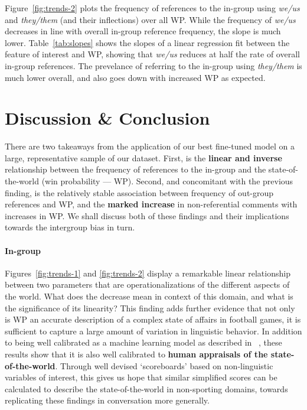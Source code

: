 Figure~\ref{fig:trends-2} plots the frequency of references to the in-group using \emph{we/us} and \emph{they/them} (and their inflections) over all WP. While the frequency of \emph{we/us} decreases in line with overall in-group reference frequency, the slope is much lower. Table~\ref{tab:slopes} shows the slopes of a linear regression fit between the feature of interest and WP, showing that \emph{we/us} reduces at half the rate of overall in-group references. The prevelance of referring to the in-group using \emph{they/them} is much lower overall, and also goes down with increased WP as expected.

\section{Discussion \& Conclusion}
\label{sec:football-conclusion}

There are two takeaways from the application of our best fine-tuned model on a large, representative sample of our dataset. First, is the \textbf{linear and inverse} relationship between the frequency of references to the in-group and the state-of-the-world (win probability --- WP). Second, and concomitant with the previous finding, is the relatively stable association between frequency of out-group references and WP, and the \textbf{marked increase} in non-referential comments with increases in WP. We shall discuss both of these findings and their implications towards the intergroup bias in turn.

\paragraph{In-group} Figures~\ref{fig:trends-1} and \ref{fig:trends-2} display a remarkable linear relationship between two parameters that are operationalizations of the different aspects of the world. What does the decrease mean in context of this domain, and what is the significance of its linearity? This finding adds further evidence that not only is WP an accurate description of a complex state of affairs in football games, it is sufficient to capture a large amount of variation in linguistic behavior. In addition to being well calibrated as a machine learning model as described in ~\citet{baldwin2021nflfastr}, these results show that it is also well calibrated to \textbf{human appraisals of the state-of-the-world}. Through well devised `scoreboards' based on non-linguistic variables of interest, this gives us hope that similar simplified scores can be calculated to describe the state-of-the-world in non-sporting domains, towards replicating these findings in conversation more generally.

